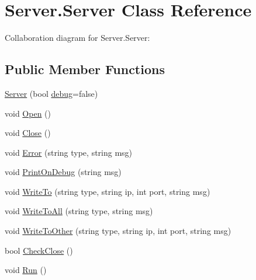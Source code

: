 \hypertarget{class_server_1_1_server}{}\section{Server.\+Server Class Reference}
\label{class_server_1_1_server}


Collaboration diagram for Server.\+Server\+:
\subsection*{Public Member Functions}
\begin{DoxyCompactItemize}
\item 
\hyperlink{class_server_1_1_server_a8e9b2b8663928808ab906762126879fa}{Server} (bool \hyperlink{class_server_1_1_server_a944c5350249b3be31a0d9b6762e49512}{debug}=false)
\item 
void \hyperlink{class_server_1_1_server_a16a01fa77c0292a83902c19e2619eb58}{Open} ()
\item 
void \hyperlink{class_server_1_1_server_af043e9887ea794762dd17f3ed2cb2580}{Close} ()
\item 
void \hyperlink{class_server_1_1_server_a9e311d0f23134ccc2212c9fe28f15f91}{Error} (string type, string msg)
\item 
void \hyperlink{class_server_1_1_server_ab7c9f699d19ea455b66a53b0ca78b8d2}{Print\+On\+Debug} (string msg)
\item 
void \hyperlink{class_server_1_1_server_af7a81d039c792b8a0f8b001952082bb2}{Write\+To} (string type, string ip, int port, string msg)
\item 
void \hyperlink{class_server_1_1_server_ab0d8ff0323adc8a74b9dd1161140b3f8}{Write\+To\+All} (string type, string msg)
\item 
void \hyperlink{class_server_1_1_server_a0ac824900c30ddb89dc79be8e8a2340b}{Write\+To\+Other} (string type, string ip, int port, string msg)
\item 
bool \hyperlink{class_server_1_1_server_a9944a0c7ee91e196b9eefdf723b08ae4}{Check\+Close} ()
\item 
void \hyperlink{class_server_1_1_server_a40d5db9d850120c06889f827e8ce259a}{Run} ()
\end{DoxyCompactItemize}
